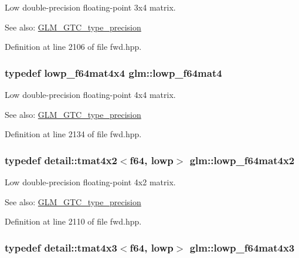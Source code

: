 Low double-precision floating-point 3x4 matrix. \begin{Desc}
\item[See also:]\hyperlink{group__gtc__type__precision}{GLM\_\-GTC\_\-type\_\-precision} \end{Desc}


Definition at line 2106 of file fwd.hpp.\hypertarget{group__gtc__type__precision_g4378d9384f1b24848043ccb02dcf2959}{
\subsubsection[lowp\_\-f64mat4]{\setlength{\rightskip}{0pt plus 5cm}typedef lowp\_\-f64mat4x4 {\bf glm::lowp\_\-f64mat4}}}
\label{group__gtc__type__precision_g4378d9384f1b24848043ccb02dcf2959}


Low double-precision floating-point 4x4 matrix. \begin{Desc}
\item[See also:]\hyperlink{group__gtc__type__precision}{GLM\_\-GTC\_\-type\_\-precision} \end{Desc}


Definition at line 2134 of file fwd.hpp.\hypertarget{group__gtc__type__precision_g37d10de43251a9a1be734bbb340ad2e7}{
\subsubsection[lowp\_\-f64mat4x2]{\setlength{\rightskip}{0pt plus 5cm}typedef detail::tmat4x2$<$f64, lowp$>$ {\bf glm::lowp\_\-f64mat4x2}}}
\label{group__gtc__type__precision_g37d10de43251a9a1be734bbb340ad2e7}


Low double-precision floating-point 4x2 matrix. \begin{Desc}
\item[See also:]\hyperlink{group__gtc__type__precision}{GLM\_\-GTC\_\-type\_\-precision} \end{Desc}


Definition at line 2110 of file fwd.hpp.\hypertarget{group__gtc__type__precision_g05dba0f9d45301c7b10a9276c60b8a0e}{
\subsubsection[lowp\_\-f64mat4x3]{\setlength{\rightskip}{0pt plus 5cm}typedef detail::tmat4x3$<$f64, lowp$>$ {\bf glm::lowp\_\-f64mat4x3}}}
\label{group__gtc__type__precision_g05dba0f9d45301c7b10a9276c60b8a0e}


